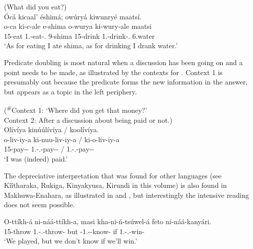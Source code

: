 \documentclass[output=paper]{langscibook}
\begin{document}
\ea
\label{bkm:Ref110329810}
(What did you eat?)\\
Ócá kicaal’ éshimá; owúryá kiwunryé maatsí.\\
\gll
o-ca  ki-c-ale  e-shima  o-wurya  ki-wury-ale  maatsi\\
15-eat  1\SG{}.\SM{}-eat-\PFV{}.\CJ{}  9-shima  15-drink  1\SG{}.\SM{}-drink-\PFV{}.\CJ{}  6.water\\
\glt
‘As for eating I ate shima, as for drinking I drank water.’\\

\z

Predicate doubling is most natural when a discussion has been going on and a point needs to be made, as illustrated by the contexts for . Context 1 is presumably out because the predicate forms the new information in the answer, but appears as a topic in the left periphery.

\ea
\label{bkm:Ref109548576}
(\textsuperscript{\#}Context 1: ‘Where did you get that money?’\\
Context 2: After a discussion about being paid or not.)\\
Olívíya kinúúlívíya / koolívíya.\\
\gll
o-liv-iy-a  ki-nuu-liv-iy-a   / ki-o-liv-iy-a\\
15-pay-\PASS{}-\FV{}  1\SG{}.\SM{}-\PFV{}.\PERS{}-pay-\PASS{}-\FV{}  / 1\SG{}.\SM{}-\PFV{}.\DJ{}-pay-\PASS{}-\FV{}\\
\glt
‘I was (indeed) paid.’ \\

\z

The depreciative interpretation that was found for other languages (see Kîîtharaka, Rukiga, Kinyakyusa, Kirundi in this volume) is also found in Makhuwa-Enahara, as illustrated in  and , but interestingly the intensive reading does not seem possible.

\ea
\label{bkm:Ref110329886}
\gll
O-ttíkh-á  ni-náá-ttíkh-a,  masi  kha-ni-ń-tsúwel-á feto  ni-náá-kanyári. \\
15-throw  1\PL{}.\SM{}-\PRS{}.\DJ{}-throw-\FV{}  but  \NEG{}-1\PL{}.\SM{}-\PRS{}-know-\FV{}   if  1\PL{}.\SM{}-\PRS{}.\DJ{}-win-\FV{} \\
\glt
‘We played, but we don’t know if we’ll win.’\\
\end{document}
